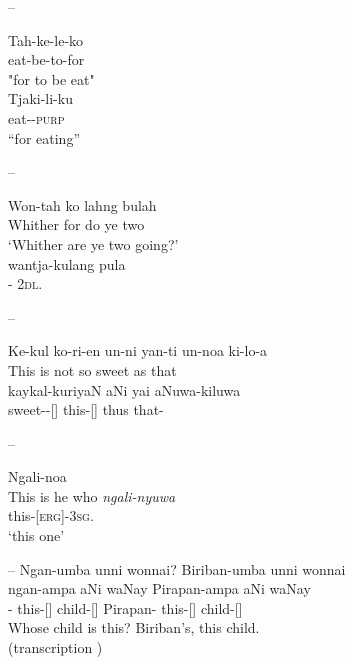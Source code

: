 \documentclass{langscibook}
\begin{document}
--
\ea\label{ex:3:3-17}
\begin{xlist}
\ex
\gll Tah-ke-le-ko \\                                 
eat-be-to-for \\
\glt "for to be eat" \\
\ex
\gll Tjaki-li-ku \\
eat--\textsc{purp} \\
\glt  “for eating” \\
\citep[11]{threlkeld_specimens_1927}
\z
\z

--
\ea\label{ex:3:3-18}
\begin{xlist}
\ex
\gll Won-tah ko lahng bulah \\
Whither for do ye two \\
\glt `Whither are ye two going?' \\
\ex
\gll wantja-kulang pula \\
- 2\textsc{dl}.  \\
\glt \citep[8]{threlkeld_specimens_1927}
\end{xlist}
\z

--
\ea\label{ex:3:19}
\begin{xlist}
\ex Ke-kul ko-ri-en un-ni yan-ti un-noa ki-lo-a \\
\glt This is not so sweet as that \\
\citep[17]{threlkeld_australian_1834}
\ex 
\gll kaykal-kuriyaN aNi yai aNuwa-kiluwa \\
sweet--[] this-[] thus that- \\
\glt \citep[62]{lissarrague_salvage_2006} 
\end{xlist}
\z
--
\ea\label{ex:3:3-20}
\begin{xlist}
\ex Ngali-noa \\
\glt This is he who
\ex    
\gll \textit{ngali-nyuwa} \\
this-[\textsc{erg}]-3\textsc{sg}. \\
\glt `this one' \\
\citep[22]{threlkeld_australian_1834}
\end{xlist}
\z
--
\ea\label{ex:3:3-21}
\glll Ngan-umba       unni      	      wonnai?             Biriban-umba       unni   	               wonnai \\
ngan-ampa       aNi         	      waNay               Pirapan-ampa     aNi      	waNay \\
-   this-[]    child-[]     Pirapan-      this-[]       child-[] \\
\glt Whose child is this? Biriban’s, this child. \\
(transcription \citealt[42]{lissarrague_salvage_2006}) 
\z


\end{xlist}
\end{document}
